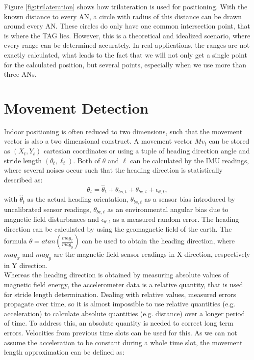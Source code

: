 Figure \ref{fig:trilateration} shows how trilateration is used for positioning. With the known distance to every AN, a circle with radius of this distance can be drawn around every AN. These circles do only have one common intersection point, that is where the TAG lies. However, this is a theoretical and idealized scenario, where every range can be determined accurately. In real applications, the ranges are not exactly calculated, what leads to the fact that we will not only get a single point for the calculated position, but several points, especially when we use more than three ANs.

\section{Movement Detection}
Indoor positioning is often reduced to two dimensions, such that the movement vector is also a two dimensional construct. A movement vector $Mv_{t}$ can be stored as $(X_{t}, Y_{t})$ cartesian coordinates or using a tuple of heading direction angle and stride length $(\theta_{t}, \ell_{t})$. Both of $\theta$ and $\ell$ can be calculated by the IMU readings, where several noises occur such that the heading direction is statistically described as:
\begin{equation}
\theta_{t} = \hat{\theta}_{t} + \theta_{bs,t} + \theta_{be,t} + \epsilon_{\theta, t},
\label{eqn:heading_direction}
\end{equation}
with $\hat{\theta}_{t}$ as the actual heading orientation,  $\theta_{bs,t}$ as a sensor bias introduced by uncalibrated sensor readings, $\theta_{be,t}$ as an environmental angular bias due to magnetic field disturbances and $\epsilon_{\theta, t}$ as a measured random error. The heading direction can be calculated by using the geomagnetic field of the earth. The formula $\theta = atan(\frac{mag_{x}}{mag_{y}})$ can be used to obtain the heading direction, where $mag_{x}$ and $mag_{y}$ are the magnetic field sensor readings in X direction, respectively in Y direction.\\
\noindent\hspace*{5mm}%
Whereas the heading direction is obtained by measuring absolute values of magnetic field energy, the accelerometer data is a relative quantity, that is used for stride length determination. Dealing with relative values, measured errors propagate over time, so it is almost impossible to use relative quantities (e.g. acceleration) to calculate absolute quantities (e.g. distance) over a longer period of time. To address this, an absolute quantity is needed to correct long term errors. Velocities from previous time slots can be used for this. As we can not assume the acceleration to be constant during a whole time slot, the movement length approximation can be defined as: 
